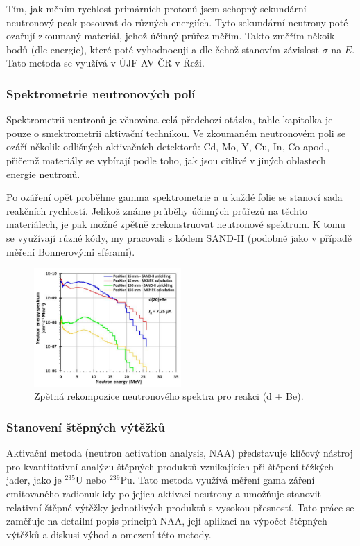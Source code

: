 Tím, jak měním rychlost primárních protonů jsem schopný sekundární neutronový peak posouvat do různých energiích. Tyto sekundární neutrony poté ozařují zkoumaný materiál, jehož účinný průřez měřím. Takto změřím někoik bodů (dle energie), které poté vyhodnocuji a dle čehož stanovím závislost $\sigma$ na $E$. Tato metoda se využívá v ÚJF AV ČR v Řeži.

\subsubsection{Spektrometrie neutronových polí}

Spektrometrii neutronů je věnována celá předchozí otázka, tahle kapitolka je pouze o smektrometrii aktivační technikou. Ve zkoumaném neutronovém poli se ozáří několik odlišných aktivačních detektorů: Cd, Mo, Y, Cu, In, Co apod., přičemž materiály se vybírají podle toho, jak jsou citlivé v jiných oblastech energie neutronů.

Po ozáření opět proběhne gamma spektrometrie a u každé folie se stanoví sada reakčních rychlostí. Jelikož známe průběhy účinných průřezů na těchto materiálech, je pak možné zpětně zrekonstruovat neutronové spektrum. K tomu se využívají různé kódy, my pracovali s kódem SAND-II (podobně jako v případě měření Bonnerovými sférami).

\begin{figure}[H]
    \centering
    \includegraphics[width=0.5\textwidth]{img/spektrum_aktivacne.JPG}
    \caption{Zpětná rekompozice neutronového spektra pro reakci (d + Be).}
\end{figure}

\subsubsection{Stanovení štěpných výtěžků}


Aktivační metoda (neutron activation analysis, NAA) představuje klíčový nástroj pro kvantitativní analýzu štěpných produktů vznikajících při štěpení těžkých jader, jako je $^{235}$U nebo $^{239}$Pu. Tato metoda využívá měření gama záření emitovaného radionuklidy po jejich aktivaci neutrony a umožňuje stanovit relativní štěpné výtěžky jednotlivých produktů s vysokou přesností. Tato práce se zaměřuje na detailní popis principů NAA, její aplikaci na výpočet štěpných výtěžků a diskusi výhod a omezení této metody.

